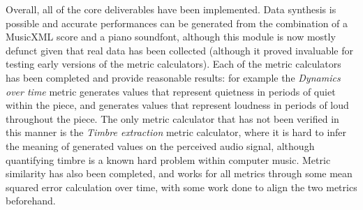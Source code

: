\documentclass{article}
\begin{document}
Overall, all of the core deliverables have been implemented. Data synthesis is possible and accurate performances can be generated from the combination of a MusicXML score and a piano soundfont, although this module is now mostly defunct given that real data has been collected (although it proved invaluable for testing early versions of the metric calculators). Each of the metric calculators has been completed and provide reasonable results: for example the \textit{Dynamics over time} metric generates values that represent quietness in periods of quiet within the piece, and generates values that represent loudness in periods of loud throughout the piece. The only metric calculator that has not been verified in this manner is the \textit{Timbre extraction} metric calculator, where it is hard to infer the meaning of generated values on the perceived audio signal, although quantifying timbre is a known hard problem within computer music. Metric similarity has also been completed, and works for all metrics through some mean squared error calculation over time, with some work done to align the two metrics beforehand.




    
\end{document}
